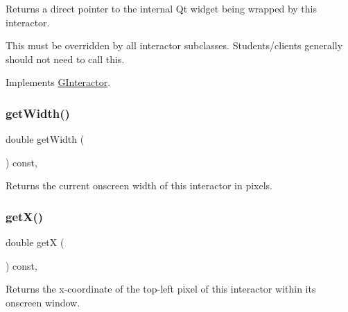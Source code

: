 Returns a direct pointer to the internal Qt widget being wrapped by this interactor. 

This must be overridden by all interactor subclasses. Students/clients generally should not need to call this. 

Implements \mbox{\hyperlink{classsgl_1_1GInteractor}{G\+Interactor}}.

\mbox{\label{classsgl_1_1GInteractor_a0ed2965abd4f5701d2cadf71239faf19}} 
\subsubsection{\texorpdfstring{get\+Width()}{getWidth()}}
{\footnotesize\ttfamily double get\+Width (\begin{DoxyParamCaption}{ }\end{DoxyParamCaption}) const\hspace{0.3cm}{\ttfamily [virtual]}, {\ttfamily [inherited]}}



Returns the current onscreen width of this interactor in pixels. 

\mbox{\label{classsgl_1_1GInteractor_a344385751bee0720059403940d57a13e}} 
\subsubsection{\texorpdfstring{get\+X()}{getX()}}
{\footnotesize\ttfamily double getX (\begin{DoxyParamCaption}{ }\end{DoxyParamCaption}) const\hspace{0.3cm}{\ttfamily [virtual]}, {\ttfamily [inherited]}}



Returns the x-\/coordinate of the top-\/left pixel of this interactor within its onscreen window. 

\mbox{\label{classsgl_1_1GInteractor_aafa51c7f8f38a09febbb9ce7853f77b4}} 
